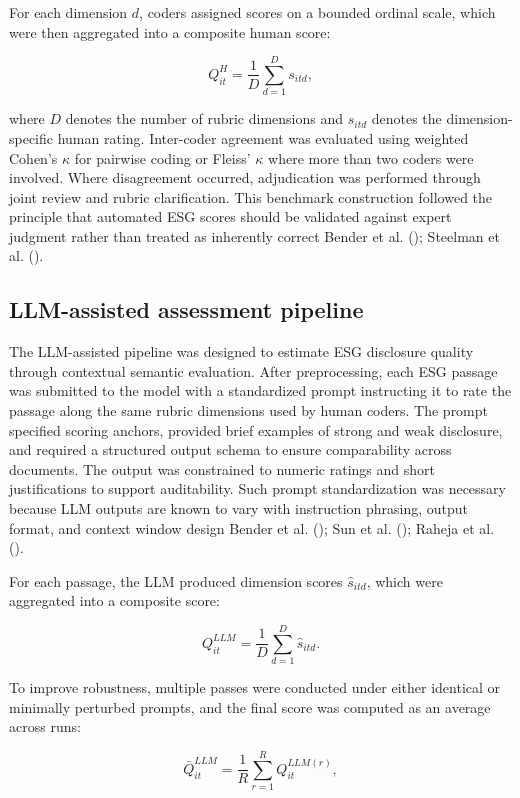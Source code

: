 \documentclass[
  12pt,
]{article}
\begin{document}
For each dimension \(d\), coders assigned scores on a bounded ordinal
scale, which were then aggregated into a composite human score:

\[
Q^H_{it} = \frac{1}{D}\sum_{d=1}^{D} s_{itd},
\]

where \(D\) denotes the number of rubric dimensions and \(s_{itd}\)
denotes the dimension-specific human rating. Inter-coder agreement was
evaluated using weighted Cohen's \(\kappa\) for pairwise coding or
Fleiss' \(\kappa\) where more than two coders were involved. Where
disagreement occurred, adjudication was performed through joint review
and rubric clarification. This benchmark construction followed the
principle that automated ESG scores should be validated against expert
judgment rather than treated as inherently correct Bender et al.
(); Steelman et al.
().

\subsection{LLM-assisted assessment
pipeline}\label{llm-assisted-assessment-pipeline}

The LLM-assisted pipeline was designed to estimate ESG disclosure
quality through contextual semantic evaluation. After preprocessing,
each ESG passage was submitted to the model with a standardized prompt
instructing it to rate the passage along the same rubric dimensions used
by human coders. The prompt specified scoring anchors, provided brief
examples of strong and weak disclosure, and required a structured output
schema to ensure comparability across documents. The output was
constrained to numeric ratings and short justifications to support
auditability. Such prompt standardization was necessary because LLM
outputs are known to vary with instruction phrasing, output format, and
context window design Bender et al. ();
Sun et al. (); Raheja et al.
().

For each passage, the LLM produced dimension scores \(\hat{s}_{itd}\),
which were aggregated into a composite score:

\[
Q^{LLM}_{it} = \frac{1}{D}\sum_{d=1}^{D} \hat{s}_{itd}.
\]

To improve robustness, multiple passes were conducted under either
identical or minimally perturbed prompts, and the final score was
computed as an average across runs:

\[
\bar{Q}^{LLM}_{it} = \frac{1}{R}\sum_{r=1}^{R} Q^{LLM(r)}_{it},
\]
\end{document}

